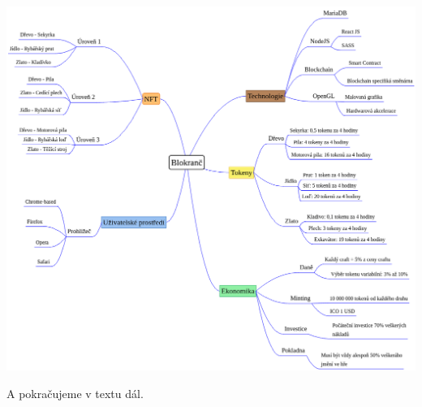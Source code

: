 \documentclass{article}
\begin{document}
\begin{spacing}{1.15}
		\begin{center}
			\label{Myšlenková mapa}
			\includegraphics[scale=0.5]{221104-NPH-Blokranč.png}
		\end{center}
		
		
		A pokračujeme v textu dál.
	
	\end{spacing}
\end{document}
